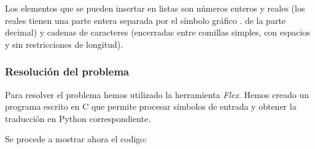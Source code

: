 \documentclass[11pt,a4paper]{article}
\begin{document}
		Los elementos que se pueden insertar en listas son números enteros y reales (los reales tienen una parte entera
		separada por el símbolo gráfico . de la parte decimal) y cadenas de caracteres (encerradas entre comillas
		simples, con espacios y sin restricciones de longitud).
		
		\subsubsection{Resolución del problema}
		Para resolver el problema hemos utilizado la herramienta \textit{Flex}. Hemos creado un programa escrito en C
		que permite procesar símbolos de entrada y obtener la traducción en Python correspondiente. \par
		
		Se procede a mostrar ahora el codigo:
		
\end{document}
